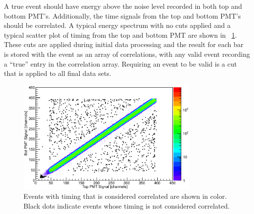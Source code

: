 A true event should have energy above the noise level recorded in both top and bottom PMT's.  Additionally, the time signals from the top and bottom PMT's should be correlated.  A typical energy spectrum with no cuts applied and a typical scatter plot of timing from the top and bottom PMT are shown in {\fig}~\ref{fig:realEvent}.  These cuts are applied during initial data processing and the result for each bar is stored with the event as an array of correlations, with any valid event recording a ``true'' entry in the correlation array.  Requiring an event to be valid is a cut that is applied to all final data sets.
\begin{figure}[!htbp]
\centering
\includegraphics[width=0.8\textwidth]{figures/realTiming.eps}
\caption{Events with timing that is considered correlated are shown in color.  Black dots indicate events whose timing is not considered correlated.}
\label{fig:realEvent}
\end{figure}


